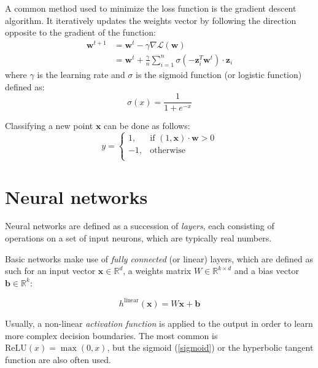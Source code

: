 \documentclass[a4paper,11pt,oneside]{report}
\begin{document}
A common method used to minimize the loss function is the gradient descent algorithm. It iteratively updates the weights vector by following the direction opposite to the gradient of the function:
\begin{align}\label{gradient_descent}
    \mathbf{w}^{t+1} & = \mathbf{w}^t - \gamma\nabla\mathcal{L}(\mathbf{w}) \nonumber \\ 
    & = \mathbf{w}^t + \frac{\gamma}{n} \sum_{i=1}^{n} \sigma(-\mathbf{z}_i^T \mathbf{w}^t) \cdot \mathbf{z}_i
\end{align}
where $\gamma$ is the learning rate and $\sigma$ is the sigmoid function (or logistic function) defined as:
\begin{equation}\label{sigmoid}
    \sigma(x) = \frac{1}{1 + e^{-x}}
\end{equation}

Classifying a new point $\mathbf{x}$ can be done as follows:
\begin{equation}\label{logistic_reg_pred}
    y = 
    \begin{cases}
        1, & \text{if } (1, \mathbf{x}) \cdot \mathbf{w} > 0 \\
        -1, & \text{otherwise} \\
    \end{cases}
\end{equation}

\section{Neural networks}

Neural networks are defined as a succession of \emph{layers}, each consisting of operations on a set of input neurons, which are typically real numbers.

Basic networks make use of \emph{fully connected} (or linear) layers, which are defined as such for an input vector $\mathbf{x} \in \mathbb{R}^d$, a weights matrix $W \in \mathbb{R}^{k \times d}$ and a bias vector $\mathbf{b} \in \mathbb{R}^k$:

\begin{equation}\label{linear_layer}
    h^{\mathrm{linear}}(\mathbf{x}) = W \mathbf{x} + \mathbf{b}
\end{equation}

Usually, a non-linear \emph{activation function} is applied to the output in order to learn more complex decision boundaries. The most common is $\mathrm{ReLU}(x) = \max(0, x)$, but the sigmoid (\ref{sigmoid}) or the hyperbolic tangent function are also often used.
\end{document}
